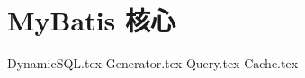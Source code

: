 \documentclass{PionpillNote-book}
\begin{document}
\chapter{MyBatis 核心}
{DynamicSQL.tex}
{Generator.tex}
{Query.tex}
{Cache.tex}

\end{document}
